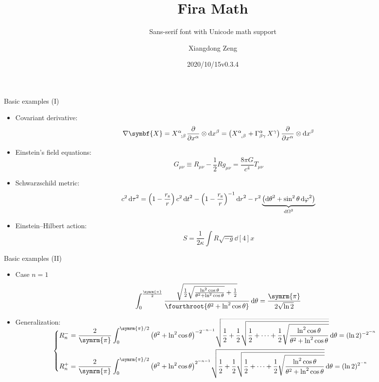 \documentclass[aspectratio=169]{beamer}
\title{Fira Math}
\subtitle{Sans-serif font with Unicode math support}
\author{Xiangdong Zeng}
\date{2020/10/15\quad v0.3.4}
\def\pp{\symrm{\pi}}
\begin{document}
\maketitle

\begin{frame}{Basic examples (I)}
\begin{itemize}
  \item Covariant derivative:
    \[
      \nabla \symbf{X} = \tensor{X}{^\alpha_{;\beta}} \pdv{x^\alpha} \otimes \dd{x^\beta}
                       = \qty(\tensor{X}{^\alpha_{,\beta}} + \Gamma^{\alpha}_{\beta\gamma} \, X^\gamma) \,
                         \pdv{x^\alpha} \otimes \dd{x^\beta}
    \]
  \item Einstein's field equations:
    \[ G_{\mu\nu} \equiv R_{\mu\nu} - \frac{1}{2} R g_{\mu\nu} = \frac{8\pi G}{c^4} T_{\mu\nu} \]
  \item Schwarzschild metric:
    \[
      c^2 \dd{\tau}^2 = \qty(1-\frac{r_{\mathrm{s}}}{r}) \, c^2 \dd{t}^2
                      - \qty(1-\frac{r_{\mathrm{s}}}{r})^{-1} \dd{r}^2
                      - r^2 \underbrace{\qty(\dd{\theta}^2 + \sin^2 \theta \dd{\varphi}^2)}_{\dd{\Omega}^2}
    \]
  \item Einstein--Hilbert action:
    \[ S = \frac{1}{2\kappa} \int R \sqrt{-g} \dd[4]{x} \]
\end{itemize}
\end{frame}

\begin{frame}{Basic examples (II)}
\begin{itemize}
  \item Case $n=1$
    \small
    \[
      \int_0^{\frac{\pp}{2}}
        \frac{\sqrt{\frac12 \sqrt{\frac{\ln^2\cos\theta}{\theta^2+\ln^2\cos\theta}} + \frac12}}%
            {\fourthroot{\theta^2 + \ln^2\cos\theta}} \dd{\theta}
      = \frac{\pp}{2\sqrt{\ln 2}}
    \]
  \item Generalization:
    \small\vspace{1ex}
    \[
      \begin{cases}
        \smash[t]{\displaystyle
          R_n^- = \frac{2}{\pp} \int_0^{\pp/2} \qty(\theta^2+\ln^2\cos\theta)^{-2^{-n-1}}
                  \sqrt{\frac12+\frac12\sqrt{\frac12+\cdots+\frac12\sqrt{
                        \frac{\ln^2\cos\theta}{\theta^2+\ln^2\cos\theta}}}} \dd{\theta}
                = (\ln 2)^{-2^{-n}}} \\[3ex]
        \smash[b]{\displaystyle
          R_n^+ = \frac{2}{\pp} \int_0^{\pp/2} \qty(\theta^2+\ln^2\cos\theta)^{2^{-n-1}}
                  \sqrt{\frac12+\frac12\sqrt{\frac12+\cdots+\frac12\sqrt{
                        \frac{\ln^2\cos\theta}{\theta^2+\ln^2\cos\theta}}}} \dd{\theta}
                = (\ln 2)^{2^{-n}}}
      \end{cases}
    \]
\end{itemize}
\end{frame}
\end{document}
